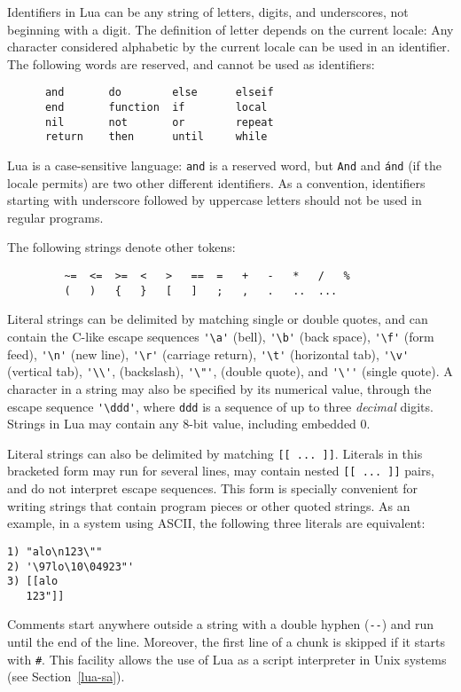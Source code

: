 \documentclass[11pt]{article}
\newcommand{\See}[1]{Section~\ref{#1}}
\newcommand{\see}[1]{(see \See{#1})}
\newcommand{\T}[1]{{\tt #1}}
\newcommand{\Index}[1]{#1\index{#1}}
\begin{document}
\Index{Identifiers} in Lua can be any string of letters,
digits, and underscores,
not beginning with a digit.
The definition of letter depends on the current locale:
Any character considered alphabetic by the current locale
can be used in an identifier.
The following words are reserved, and cannot be used as identifiers:
\begin{verbatim}
      and       do        else      elseif
      end       function  if        local
      nil       not       or        repeat
      return    then      until     while
\end{verbatim}
Lua is a case-sensitive language:
\T{and} is a reserved word, but \T{And} and \T{\'and}
(if the locale permits) are two other different identifiers.
As a convention, identifiers starting with underscore followed by
uppercase letters should not be used in regular programs.

The following strings denote other \Index{tokens}:
\begin{verbatim}
         ~=  <=  >=  <   >   ==  =   +   -   *   /   %
         (   )   {   }   [   ]   ;   ,   .   ..  ...
\end{verbatim}

\Index{Literal strings} can be delimited by matching single or double quotes,
and can contain the C-like escape sequences
\verb|'\a'| (bell),
\verb|'\b'| (back space),
\verb|'\f'| (form feed),
\verb|'\n'| (new line),
\verb|'\r'| (carriage return),
\verb|'\t'| (horizontal tab),
\verb|'\v'| (vertical tab),
\verb|'\\'|, (backslash),
\verb|'\"'|, (double quote),
and \verb|'\''| (single quote).
A character in a string may also be specified by its numerical value,
through the escape sequence \verb|'\ddd'|,
where \verb|ddd| is a sequence of up to three \emph{decimal} digits.
Strings in Lua may contain any 8-bit value, including embedded 0.

Literal strings can also be delimited by matching \verb|[[ ... ]]|.
Literals in this bracketed form may run for several lines,
may contain nested \verb|[[ ... ]]| pairs,
and do not interpret escape sequences.
This form is specially convenient for
writing strings that contain program pieces or
other quoted strings.
As an example, in a system using ASCII,
the following three literals are equivalent:
\begin{verbatim}
1) "alo\n123\""
2) '\97lo\10\04923"'
3) [[alo
   123"]]
\end{verbatim}


\Index{Comments} start anywhere outside a string with a
double hyphen (\verb|--|) and run until the end of the line.
Moreover,
the first line of a chunk is skipped if it starts with \verb|#|.
This facility allows the use of Lua as a script interpreter
in Unix systems \see{lua-sa}.
\end{document}
